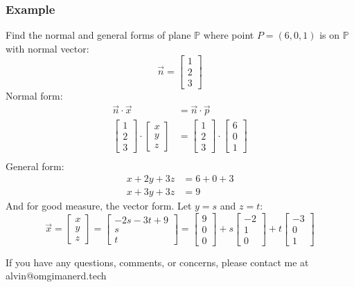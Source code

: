 \documentclass[letterpaper, 12pt]{math}
\begin{document}
\subsubsection*{Example}
Find the normal and general forms of plane \( \mathbb{P} \) where point
\( P = (6,0,1) \) is on \( \mathbb{P} \) with normal vector:
\[ \vec{n} = \begin{bmatrix}1 \\ 2 \\ 3\end{bmatrix} \]
Normal form:
\begin{align*}
  \vec{n}\cdot\vec{x} &= \vec{n}\cdot\vec{p} \\
  \begin{bmatrix}1 \\ 2 \\ 3\end{bmatrix}\cdot
    \begin{bmatrix}x \\ y \\ z\end{bmatrix} &=
    \begin{bmatrix}1 \\ 2 \\ 3\end{bmatrix}\cdot
    \begin{bmatrix}6 \\ 0 \\ 1\end{bmatrix} \\
\end{align*}
General form:
\begin{align*}
  x+2y+3z &= 6+0+3 \\
  x+3y+3z &= 9
\end{align*}
And for good measure, the vector form. Let \( y = s \) and \( z = t \):
\[ \vec{x} = \begin{bmatrix}x \\ y \\ z\end{bmatrix} =
  \begin{bmatrix}-2s-3t+9 \\ s \\ t\end{bmatrix} =
  \begin{bmatrix}9 \\ 0 \\ 0\end{bmatrix}+
  s\begin{bmatrix}-2 \\ 1 \\ 0\end{bmatrix}+
  t\begin{bmatrix}-3 \\ 0 \\ 1\end{bmatrix} \]

\begin{center}
  If you have any questions, comments, or concerns, please contact me at
  alvin@omgimanerd.tech
\end{center}
\end{document}
